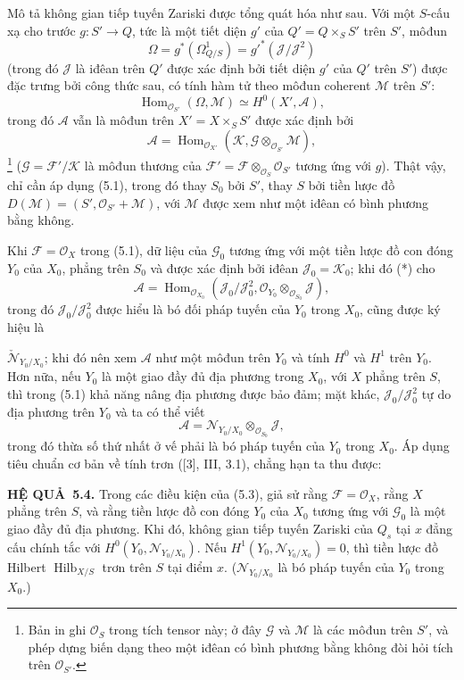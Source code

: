 \documentclass[11pt,twoside,openany]{book}
\numberwithin{equation}{section}
\newcommand{\src}[1]{%
  \phantomsection\hypertarget{src:\fgasourceid:#1}{}%
  \marginpar{\raggedleft\footnotesize\sffamily #1}%
}
\newcommand{\fgasourceid}{unset}
\newcommand{\result}[2]{\par\medskip\noindent\textbf{#1\if\relax\detokenize{#2}\relax\else\ #2\fi.}\quad}
\begin{document}
Mô tả không gian tiếp tuyến Zariski được tổng quát hóa như sau. Với một
$S$-cấu xạ cho trước $g:S'\longrightarrow Q$, tức là một tiết diện $g'$ của
$Q'=Q\times_SS'$ trên $S'$, môđun
\[
\Omega=g^*(\Omega^1_{Q/S})=g'^*(\mathcal J/\mathcal J^2)
\]
(trong đó $\mathcal J$ là iđêan trên $Q'$ được xác định bởi tiết diện $g'$ của
$Q'$ trên $S'$) được đặc trưng bởi công thức sau, có tính hàm tử theo môđun coherent
$\mathcal M$ trên $S'$:
\[
\operatorname{Hom}_{\mathcal O_{S'}}(\Omega,\mathcal M)
\simeq H^0(X',\mathcal A),
\]
trong đó $\mathcal A$ vẫn là môđun trên $X'=X\times_SS'$ được xác định bởi
\[
\mathcal A=\operatorname{Hom}_{\mathcal O_{X'}}
(\mathcal K,\mathcal G\otimes_{\mathcal O_{S'}}\mathcal M),
\]
\footnote{Bản in ghi $\mathcal O_S$ trong tích tensor này; ở đây $\mathcal G$
và $\mathcal M$ là các môđun trên $S'$, và phép dựng biến dạng theo một iđêan
có bình phương bằng không đòi hỏi tích trên $\mathcal O_{S'}$.}
($\mathcal G=\mathcal F'/\mathcal K$ là môđun thương của
$\mathcal F'=\mathcal F\otimes_{\mathcal O_S}\mathcal O_{S'}$ tương ứng với
$g$). Thật vậy, chỉ cần áp dụng (5.1), trong đó thay $S_0$ bởi $S'$, thay $S$
bởi tiền lược đồ $D(\mathcal M)=(S',\mathcal O_{S'}+\mathcal M)$, với
$\mathcal M$ được xem như một iđêan có bình phương bằng không.

Khi $\mathcal F=\mathcal O_X$ trong (5.1), dữ liệu của
$\mathcal G_0$ tương ứng với một tiền lược đồ con đóng $Y_0$ của
$X_0$, phẳng trên $S_0$ và được xác định bởi iđêan
$\mathcal J_0=\mathcal K_0$; khi đó (*) cho
\[
\mathcal A=\operatorname{Hom}_{\mathcal O_{X_0}}
(\mathcal J_0/\mathcal J_0^2,
\mathcal O_{Y_0}\otimes_{\mathcal O_{S_0}}\mathcal J),
\]
trong đó $\mathcal J_0/\mathcal J_0^2$ được hiểu là bó đối pháp tuyến của $Y_0$
trong $X_0$, cũng được ký hiệu là
\src{271}
$\check{\mathcal N}_{Y_0/X_0}$; khi đó nên xem $\mathcal A$ như một môđun
trên $Y_0$ và tính $H^0$ và $H^1$ trên $Y_0$. Hơn nữa, nếu $Y_0$ là một giao
đầy đủ địa phương trong $X_0$, với $X$ phẳng trên $S$, thì trong (5.1) khả
năng nâng địa phương được bảo đảm; mặt khác,
$\mathcal J_0/\mathcal J_0^2$ tự do địa phương trên $Y_0$ và ta có thể viết
\[
\mathcal A=\mathcal N_{Y_0/X_0}\otimes_{\mathcal O_{S_0}}\mathcal J,
\]
trong đó thừa số thứ nhất ở vế phải là bó pháp tuyến của $Y_0$ trong $X_0$.
Áp dụng tiêu chuẩn cơ bản về tính trơn ([3], III, 3.1), chẳng hạn ta thu được:

\result{HỆ QUẢ}{5.4} Trong các điều kiện của (5.3), giả sử rằng
$\mathcal F=\mathcal O_X$, rằng $X$ phẳng trên $S$, và rằng tiền lược đồ con
đóng $Y_0$ của $X_0$ tương ứng với $\mathcal G_0$ là một giao đầy đủ địa
phương. Khi đó, không gian tiếp tuyến Zariski của $Q_s$ tại $x$ đẳng cấu chính
tắc với $H^0(Y_0,\mathcal N_{Y_0/X_0})$. Nếu
$H^1(Y_0,\mathcal N_{Y_0/X_0})=0$, thì tiền lược đồ Hilbert
$\operatorname{Hilb}_{X/S}$ trơn trên $S$ tại điểm $x$.
($\mathcal N_{Y_0/X_0}$ là bó pháp tuyến của $Y_0$ trong $X_0$.)
\end{document}
